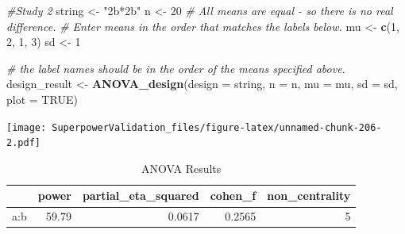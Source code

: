 \documentclass[]{book}
\newenvironment{Shaded}{\begin{snugshade}}{\end{snugshade}}
\newcommand{\CommentTok}[1]{\textcolor[rgb]{0.56,0.35,0.01}{\textit{#1}}}
\newcommand{\DataTypeTok}[1]{\textcolor[rgb]{0.13,0.29,0.53}{#1}}
\newcommand{\DecValTok}[1]{\textcolor[rgb]{0.00,0.00,0.81}{#1}}
\newcommand{\FloatTok}[1]{\textcolor[rgb]{0.00,0.00,0.81}{#1}}
\newcommand{\KeywordTok}[1]{\textcolor[rgb]{0.13,0.29,0.53}{\textbf{#1}}}
\newcommand{\NormalTok}[1]{#1}
\newcommand{\OperatorTok}[1]{\textcolor[rgb]{0.81,0.36,0.00}{\textbf{#1}}}
\newcommand{\OtherTok}[1]{\textcolor[rgb]{0.56,0.35,0.01}{#1}}
\newcommand{\StringTok}[1]{\textcolor[rgb]{0.31,0.60,0.02}{#1}}
\begin{document}
\begin{Shaded}
\begin{Highlighting}[]
\CommentTok{#Study 2}
\NormalTok{string <-}\StringTok{ "2b*2b"}
\NormalTok{n <-}\StringTok{ }\DecValTok{20}
\CommentTok{# All means are equal - so there is no real difference.}
\CommentTok{# Enter means in the order that matches the labels below.}
\NormalTok{mu <-}\StringTok{ }\KeywordTok{c}\NormalTok{(}\DecValTok{1}\NormalTok{, }\DecValTok{2}\NormalTok{, }\DecValTok{1}\NormalTok{, }\DecValTok{3}\NormalTok{) }
\NormalTok{sd <-}\StringTok{ }\DecValTok{1}

\CommentTok{# the label names should be in the order of the means specified above.}
\NormalTok{design_result <-}\StringTok{ }\KeywordTok{ANOVA_design}\NormalTok{(}\DataTypeTok{design =}\NormalTok{ string,}
                   \DataTypeTok{n =}\NormalTok{ n, }
                   \DataTypeTok{mu =}\NormalTok{ mu, }
                   \DataTypeTok{sd =}\NormalTok{ sd, }
                   \DataTypeTok{plot =} \OtherTok{TRUE}\NormalTok{)}
\end{Highlighting}
\end{Shaded}

\texttt{[image: SuperpowerValidation\_files/figure-latex/unnamed-chunk-206-2.pdf]}

\begin{Shaded}
\end{Shaded}

\begin{table}[t]

\caption{\label{tab:unnamed-chunk-206}ANOVA Results}
\centering
\begin{tabular}{l|r|r|r|r}
\hline
  & power & partial\_eta\_squared & cohen\_f & non\_centrality\\
\hline
a:b & 59.79 & 0.0617 & 0.2565 & 5\\
\hline
\end{tabular}
\end{table}
\end{document}

